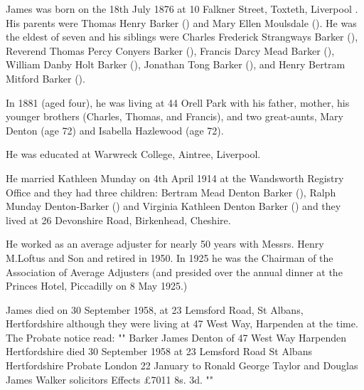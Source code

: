 
James was born on the 18th July 1876 at 10 Falkner Street, Toxteth, Liverpool \cite{JamesDBarkerBirth}. His parents were  Thomas Henry Barker () and Mary Ellen Moulsdale (). He was the eldest of seven and his siblings were Charles Frederick Strangways Barker (),  Reverend Thomas Percy Conyers Barker (), Francis Darcy Mead Barker (), William Danby Holt Barker (), Jonathan Tong Barker (), and Henry Bertram Mitford Barker ().  

In 1881 (aged four), he was living at 44 Orell Park with his father, mother, his younger brothers (Charles, Thomas, and Francis), and two great-aunts, Mary Denton (age 72) and Isabella Hazlewood (age 72).\cite{UKCensusRG11_3688}

He was educated at Warwreck College, Aintree, Liverpool.

He married Kathleen Munday on 4th April 1914 at the Wandsworth Registry Office \cite{JamesDBarkerMarriage} and they had three children: Bertram Mead Denton Barker (), Ralph Munday Denton-Barker () and Virginia Kathleen Denton Barker ()  and they lived at 26 Devonshire Road, Birkenhead, Cheshire.

He worked as an average adjuster for nearly 50 years with Messrs. Henry M.Loftus and Son and retired in 1950. In 1925 he was the Chairman of the Association of Average Adjusters (and presided over the annual dinner at the Princes Hotel, Piccadilly on 8 May 1925.)

James died on 30 September 1958, at 23 Lemsford Road, St Albans, Hertfordshire \cite{JamesDBarkerDeath} although they were living at 47 West Way, Harpenden at the time. The Probate notice read:
"" Barker James Denton of 47 West Way Harpenden Hertfordshire died 30 September 1958 at 23 Lemsford Road St Albans Hertfordshire Probate London 22 January to Ronald George Taylor and Douglas James Walker solicitors Effects £7011 8s. 3d.  ""




